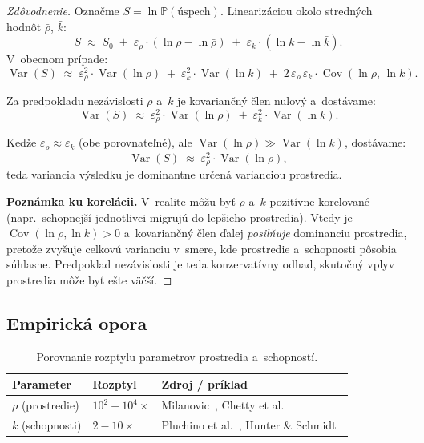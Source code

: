 \documentclass[12pt,a4paper]{article}
\begin{document}
\begin{proof}[Zdôvodnenie]
Označme $S = \ln \mathbb{P}(\text{úspech})$. Linearizáciou okolo stredných hodnôt $\bar{\rho}$, $\bar{k}$:
\begin{equation}
    S \;\approx\; S_0 \;+\; \varepsilon_\rho \cdot (\ln \rho - \ln \bar{\rho}) \;+\; \varepsilon_k \cdot (\ln k - \ln \bar{k}).
\end{equation}
V~obecnom prípade:
\begin{equation}
    \operatorname{Var}(S) \;\approx\; \varepsilon_\rho^2 \cdot \operatorname{Var}(\ln \rho) \;+\; \varepsilon_k^2 \cdot \operatorname{Var}(\ln k) \;+\; 2\,\varepsilon_\rho\,\varepsilon_k \cdot \operatorname{Cov}(\ln \rho,\, \ln k).
\end{equation}

Za predpokladu nezávislosti $\rho$ a~$k$ je kovariančný člen nulový a~dostávame:
\begin{equation}
    \operatorname{Var}(S) \;\approx\; \varepsilon_\rho^2 \cdot \operatorname{Var}(\ln \rho) \;+\; \varepsilon_k^2 \cdot \operatorname{Var}(\ln k).
\end{equation}

Keďže $\varepsilon_\rho \approx \varepsilon_k$ (obe porovnateľné), ale $\operatorname{Var}(\ln \rho) \gg \operatorname{Var}(\ln k)$, dostávame:
\begin{equation}
    \operatorname{Var}(S) \;\approx\; \varepsilon_\rho^2 \cdot \operatorname{Var}(\ln \rho),
\end{equation}
teda variancia výsledku je dominantne určená varianciou prostredia.

\textbf{Poznámka ku korelácii.} V~realite môžu byť $\rho$ a~$k$ pozitívne korelované (napr.\ schopnejší jednotlivci migrujú do lepšieho prostredia). Vtedy je $\operatorname{Cov}(\ln \rho, \ln k) > 0$ a~kovariančný člen ďalej \emph{posilňuje} dominanciu prostredia, pretože zvyšuje celkovú varianciu v~smere, kde prostredie a~schopnosti pôsobia súhlasne. Predpoklad nezávislosti je teda konzervatívny odhad, skutočný vplyv prostredia môže byť ešte väčší.
\end{proof}

\subsection{Empirická opora}

\begin{table}[h]
\centering
\begin{tabular}{@{}lll@{}}
\toprule
\textbf{Parameter} & \textbf{Rozptyl} & \textbf{Zdroj / príklad} \\
\midrule
$\rho$ (prostredie) & $10^2 - 10^4 \times$ & Milanovic~\cite{milanovic2015}, Chetty et al.~\cite{chetty2014} \\
$k$ (schopnosti)    & $2 - 10 \times$      & Pluchino et al.~\cite{pluchino2018}, Hunter \& Schmidt~\cite{hunter1998} \\
\bottomrule
\end{tabular}
\caption{Porovnanie rozptylu parametrov prostredia a~schopností.}
\label{tab:rozptyl}
\end{table}
\end{document}

